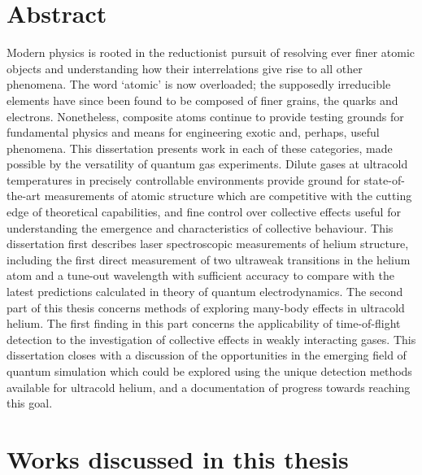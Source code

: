 \section*{Abstract}
Modern physics is rooted in the reductionist pursuit of resolving ever finer atomic objects and understanding how their interrelations give rise to all other phenomena. The word `atomic' is now overloaded; the supposedly irreducible elements have since been found to be composed of finer grains, the quarks and electrons. Nonetheless, composite atoms continue to provide testing grounds for fundamental physics and means for engineering exotic and, perhaps, useful phenomena. This dissertation presents work in each of these categories, made possible by the versatility of quantum gas experiments. Dilute gases at ultracold temperatures in precisely controllable environments provide ground for state-of-the-art measurements of atomic structure which are competitive with the cutting edge of theoretical capabilities, and fine control over collective effects useful for understanding the emergence and characteristics of collective behaviour. This dissertation first describes laser spectroscopic measurements of helium structure, including the first direct measurement of two ultraweak transitions in the helium atom and a tune-out wavelength with sufficient accuracy to compare with the latest predictions calculated in theory of quantum electrodynamics. The second part of this thesis concerns methods of exploring many-body effects in ultracold helium. The first finding in this part concerns the applicability of time-of-flight detection to the investigation of collective effects in weakly interacting gases. This dissertation closes with a discussion of the opportunities in the emerging field of quantum simulation which could be explored using the unique detection methods available for ultracold helium, and a documentation of progress towards reaching this goal.


\newpage

\section*{Works discussed in this thesis}


\newcommand{\fullpaper}[5]{\normalsize {{\bf#1}\newline #2, \IfNoValueTF{#5}{\emph{#3}}{\href{#5}{\emph{#3}}} (#4) }}
\newcommand{\citem}[1]{\item[\cite{#1}]}

